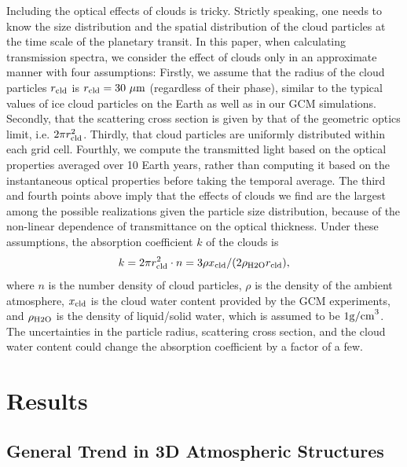 \documentclass[11pt,numberedappendix,twocolappendix,]{emulateapj}
\begin{document}
Including the optical effects of clouds is tricky. 
Strictly speaking, one needs to know the size distribution and the spatial distribution of the cloud particles at the time scale of the planetary transit. 
In this paper, when calculating transmission spectra, we consider the effect of clouds only in an approximate manner with four assumptions:
%
Firstly, we assume that the radius of the cloud particles $r_{\rm cld}$ is $r_{\rm cld}=30~\mu {\rm m}$ (regardless of their phase), similar to the typical values of ice cloud particles on the Earth as well as in our GCM simulations.  
%
Secondly, that the scattering cross section is given by that of the geometric optics limit, i.e. $2 \pi r_{\rm cld}^2$. 
%
Thirdly, that cloud particles are uniformly distributed within each grid cell. 
%
Fourthly, we compute the transmitted light based on the optical properties averaged over 10 Earth years, rather than computing it based on the instantaneous optical properties before taking the temporal average. 
%
The third and fourth points above imply that the effects of clouds we find are the largest among the possible realizations given the particle size distribution, because of the non-linear dependence of transmittance on the optical thickness. 
%
Under these assumptions, the absorption coefficient $k$ of the clouds is %
\begin{equation}
k = 2 \pi r_{\rm cld}^2 \cdot n = 3 \rho x_{\rm cld} / ( 2 \rho_{\rm H2O} r_{\rm cld} ),
\end{equation}
where $n$ is the number density of cloud particles, $\rho $ is the density of the ambient atmosphere, $x_{\rm cld}$ is the cloud water content provided by the GCM experiments, and $\rho_{\rm H2O}$ is the density of liquid/solid water, which is assumed to be $1 {\rm g/cm}^3$. 
The uncertainties in the particle radius, scattering cross section, and the cloud water content could change the absorption coefficient by a factor of a few. 



\section{Results}
\label{s:results}

\subsection{General Trend in 3D Atmospheric Structures}
\label{ss:result_H2Omixingratio}
\end{document}
